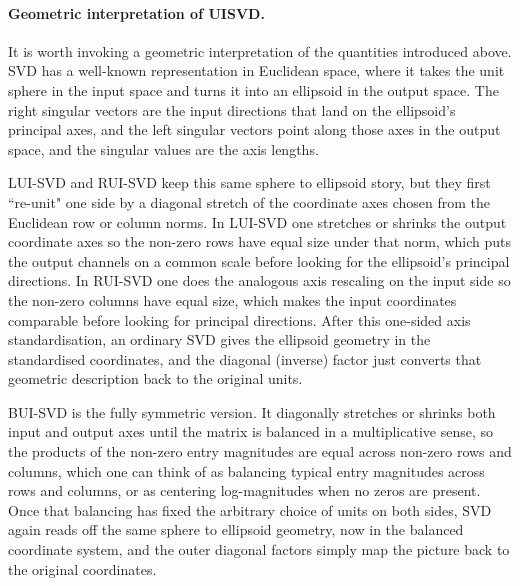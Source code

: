 \documentclass[11pt,a4paper]{article}
\begin{document}
\paragraph{Geometric interpretation of UISVD.} It is worth invoking a geometric interpretation of the quantities introduced above. SVD has a well-known representation in Euclidean space, where it takes the unit sphere in the input space and turns it into an ellipsoid in the output space. The right singular vectors are the input directions that land on the ellipsoid's principal axes, and the left singular vectors point along those axes in the output space, and the singular values are the axis lengths.

LUI-SVD and RUI-SVD keep this same sphere to ellipsoid story, but they first ``re-unit" one side by a diagonal stretch of the coordinate axes chosen from the Euclidean row or column norms. In LUI-SVD one stretches or shrinks the output coordinate axes so the non-zero rows have equal size under that norm, which puts the output channels on a common scale before looking for the ellipsoid's principal directions. In RUI-SVD one does the analogous axis rescaling on the input side so the non-zero columns have equal size, which makes the input coordinates comparable before looking for principal directions. After this one-sided axis standardisation, an ordinary SVD gives the ellipsoid geometry in the standardised coordinates, and the diagonal (inverse) factor just converts that geometric description back to the original units. 

BUI-SVD is the fully symmetric version. It diagonally stretches or shrinks both input and output axes until the matrix is balanced in a multiplicative sense, so the products of the non-zero entry magnitudes are equal across non-zero rows and columns, which one can think of as balancing typical entry magnitudes across rows and columns, or as centering log-magnitudes when no zeros are present. Once that balancing has fixed the arbitrary choice of units on both sides, SVD again reads off the same sphere to ellipsoid geometry, now in the balanced coordinate system, and the outer diagonal factors simply map the picture back to the original coordinates.
\end{document}
